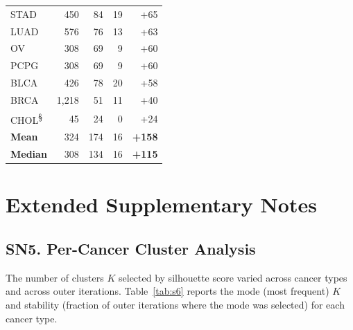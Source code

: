 \documentclass[11pt,a4paper]{article}
\begin{document}
\begin{table}[htbp]
\begin{tabular}{lrrrr}
STAD & 450 & 84 & 19 & +65 \\
LUAD & 576 & 76 & 13 & +63 \\
OV & 308 & 69 & 9 & +60 \\
PCPG & 308 & 69 & 9 & +60 \\
BLCA & 426 & 78 & 20 & +58 \\
BRCA & 1,218 & 51 & 11 & +40 \\
CHOL\textsuperscript{\S} & 45 & 24 & 0 & +24 \\
\midrule
\textbf{Mean} & 324 & 174 & 16 & \textbf{+158} \\
\textbf{Median} & 308 & 134 & 16 & \textbf{+115} \\
\bottomrule
\end{tabular}
\end{table}

\newpage
\section*{Extended Supplementary Notes}

\subsection*{SN5. Per-Cancer Cluster Analysis}

The number of clusters $K$ selected by silhouette score varied across cancer types and across outer iterations. Table~\ref{tab:s6} reports the mode (most frequent) $K$ and stability (fraction of outer iterations where the mode was selected) for each cancer type.
\end{document}
